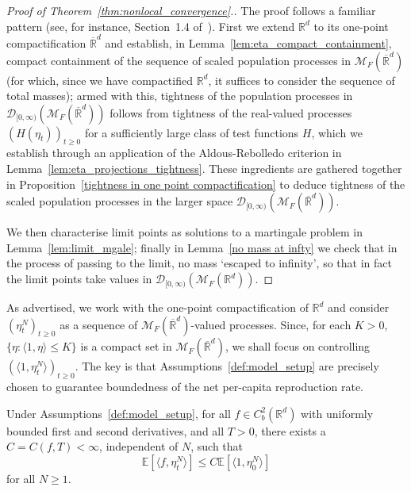 \documentclass[EJP]{ejpecp} %
\newcommand{\IE}{\mathbb E}
\newcommand{\IR}{\mathbb R}
\newcommand{\measures}{\mathcal{M}_F(\IR^d)} %
\newcommand{\cmeasures}{\mathcal{M}_F(\overline{\IR}^d)} %
\newcommand{\citet}[1]{\cite{#1}}
\begin{document}
\begin{proof}[Proof of Theorem~\ref{thm:nonlocal_convergence}.]
The proof follows a familiar pattern 
(see, for instance, Section~1.4 of~\citet{etheridge2000introduction}).
First we extend $\IR^d$ 
to its one-point compactification $\overline{\IR}^d$ and 
establish, in Lemma~\ref{lem:eta_compact_containment},
compact containment of the 
sequence of scaled population
processes in $\cmeasures$ 
(for which, since we have compactified $\IR^d$,
it suffices to consider the sequence of total masses); armed with this, 
tightness of the population processes in $\mathcal{D}_{[0,\infty)}(\cmeasures)$
follows from tightness of the real-valued processes $(H(\eta_t))_{t\geq 0}$ for a sufficiently large
class of test functions $H$, which we establish through an application of the
Aldous-Rebolledo criterion in Lemma~\ref{lem:eta_projections_tightness}.
These ingredients are gathered together in 
Proposition~\ref{tightness in one point compactification}
to deduce tightness of the scaled population processes in 
the larger space $\mathcal{D}_{[0,\infty)}(\cmeasures)$.

We then characterise
limit points as solutions to a martingale problem in
Lemma~\ref{lem:limit_mgale}; finally in Lemma~\ref{no mass at infty}
we check that 
in the process of passing to the limit, no mass `escaped to infinity', so that
in fact the limit points take values in $\mathcal{D}_{[0,\infty)}(\measures)$.
\end{proof}



As advertised, we work with the one-point compactification of $\IR^d$ and
consider $(\eta^N_t)_{t\geq 0}$ as a sequence of 
$\cmeasures$-valued processes. Since, for each $K>0$,
$\{\eta: \langle 1,\eta\rangle\leq K\}$
is a compact set in $\cmeasures$, we shall focus on 
controlling $(\langle 1,\eta^N_t\rangle)_{t\geq 0}$.
The key is that Assumptions~\ref{def:model_setup}
are precisely chosen to guarantee boundedness
of the net per-capita reproduction rate.

\begin{lemma}
    \label{lem:eta_f_bound}
    Under Assumptions~\ref{def:model_setup},
    for all $f \in C^2_b(\IR^d)$ with uniformly bounded first and 
	second derivatives, and all $T>0$, there exists a $C=C(f,T) < \infty$, 
	independent of $N$,
    such that
    \begin{equation}
\label{eta_f_bound}
        \IE[\langle f, \eta^N_t \rangle]
        \le
	    C\IE[\langle 1, \eta^N_0 \rangle]
    \end{equation}
    for all $N \geq 1$.
\end{lemma}
\end{document}
